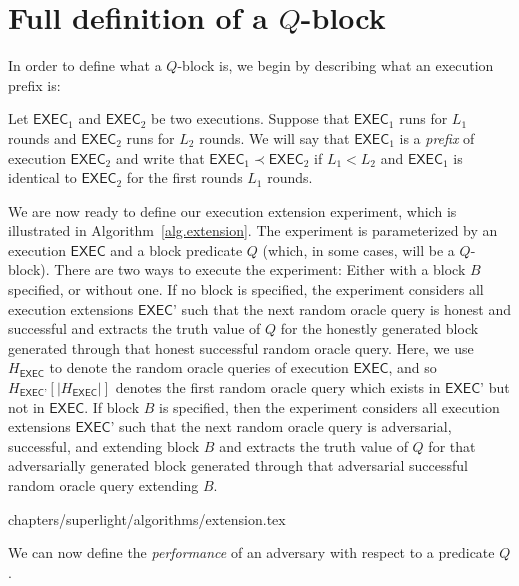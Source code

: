 \section{Full definition of a $Q$-block}
In order to define what a $Q$-block is, we begin by describing what an execution
prefix is:

\begin{definition}
	Let $\textsf{EXEC}_1$ and $\textsf{EXEC}_2$ be two executions.
	Suppose that $\textsf{EXEC}_1$ runs for $L_1$ rounds and $\textsf{EXEC}_2$
	runs for $L_2$ rounds.
	We will say that $\textsf{EXEC}_1$ is a \emph{prefix} of execution
	$\textsf{EXEC}_2$
	and write that $\textsf{EXEC}_1 \prec \textsf{EXEC}_2$
	if $L_1 < L_2$ and
	$\textsf{EXEC}_1$ is identical to $\textsf{EXEC}_2$ for the first rounds $L_1$
	rounds.
\end{definition}

We are now ready to define our execution extension experiment, which is
illustrated in Algorithm~\ref{alg.extension}. The experiment is parameterized by
an execution $\textsf{EXEC}$ and a block predicate $Q$ (which, in some cases,
will be a $Q$-block). There are two ways to execute the experiment: Either with
a block $B$ specified, or without one. If no block is specified, the experiment
considers all execution extensions $\textsf{EXEC'}$ such that the next random
oracle query is honest and successful and extracts the truth value of $Q$ for
the honestly generated block generated through that honest successful random
oracle query. Here, we use $H_\textsf{EXEC}$ to denote the random oracle
queries of execution $\textsf{EXEC}$, and so
$H_\textsf{EXEC'}[|H_\textsf{EXEC}|]$ denotes the first random oracle query
which exists in $\textsf{EXEC'}$ but not in $\textsf{EXEC}$. If block $B$ is
specified, then the experiment considers all execution extensions
$\textsf{EXEC'}$ such that the next random oracle query is adversarial,
successful, and extending block $B$ and extracts the truth value of $Q$ for that
adversarially generated block generated through that adversarial successful
random oracle query extending $B$.

{chapters/superlight/algorithms/extension.tex}

We can now define the \emph{performance} of an adversary with respect to a
predicate $Q$.

